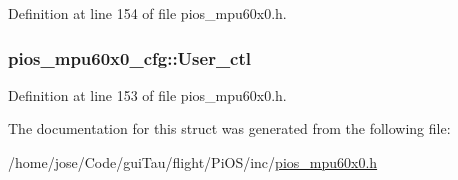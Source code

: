 Definition at line 154 of file pios\-\_\-mpu60x0.\-h.

\hypertarget{structpios__mpu60x0__cfg_a2fd36500bdaf115a26e2ce8937441a17}{
\subsubsection[{User\-\_\-ctl}]{ pios\-\_\-mpu60x0\-\_\-cfg\-::\-User\-\_\-ctl}}\label{structpios__mpu60x0__cfg_a2fd36500bdaf115a26e2ce8937441a17}


Definition at line 153 of file pios\-\_\-mpu60x0.\-h.



The documentation for this struct was generated from the following file\-:\begin{DoxyCompactItemize}
\item 
/home/jose/\-Code/gui\-Tau/flight/\-Pi\-O\-S/inc/\hyperlink{pios__mpu60x0_8h}{pios\-\_\-mpu60x0.\-h}\end{DoxyCompactItemize}
